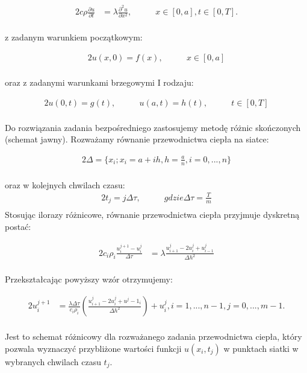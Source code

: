 \documentclass[twoside]{projektInzynierskiMS1}
\newcommand{\si}{ś}
\begin{document}
\begin{alignat*}{2}
c\rho \frac{\partial u}{\partial t}&= \lambda \frac{\partial^2 u}{\partial x^2},&\qquad  x \in [0, a], t \in [0, T].\\
\end{alignat*}


z zadanym warunkiem początkowym:

\begin{alignat*}{2}
u(x, 0) = f(x),&\qquad  x \in [0, a]\\
\end{alignat*}


oraz z zadanymi warunkami brzegowymi I rodzaju:

\begin{alignat*}{2}
u(0,t) = g(t),&\qquad  u(a, t) = h(t), &\qquad t \in [0, T]\\
\end{alignat*}


Do rozwiązania zadania bezpośredniego zastosujemy metodę różnic skończonych (schemat jawny).
Rozważamy równanie przewodnictwa ciepła na siatce:

\begin{alignat*}{2}
\Delta = \{ x_i; x_i = a + ih, h = \frac{a}{n},  i=0, ..., n\}\\
\end{alignat*}

oraz w kolejnych chwilach czasu:
\begin{alignat*}{2}
t_j = j \Delta \tau, &\qquad gdzie \Delta \tau = \frac{T}{m}\\
\end{alignat*}
Stosując ilorazy różnicowe, równanie przewodnictwa ciepła przyjmuje dyskretną postać:

\begin{alignat*}{2}
c_i \rho _i \frac{ u^{j+1}_i - u^j_i}{ \Delta \tau}&= \lambda \frac{ u^j_{i+1} - 2u^j_i+u^j_{i-1}}{\Delta h^2}\\
\end{alignat*}

Przekształcając powyższy wzór otrzymujemy:

\begin{alignat*}{2}
 u^{j+1}_i&= \frac{\lambda \Delta \tau}{c_i \rho _i} \left( \frac{u^j_{i+1} - 2u^j_i+u^j-1_i}{\Delta h^2} \right) + u^j_i, i=1, ..., n-1, j =0, ..., m-1.\\
\end{alignat*}

Jest to schemat różnicowy dla rozważanego zadania przewodnictwa ciepła, który pozwala wyznaczyć przybliżone warto\si ci funkcji $u(x_i, t_j)$ w punktach siatki w wybranych chwilach czasu $t_j$.
\end{document}
